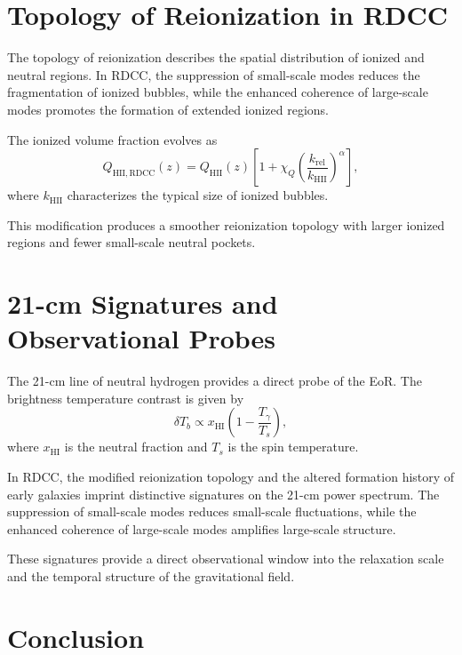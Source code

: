 \documentclass[11pt,a4paper]{article}
\begin{document}
\section{Topology of Reionization in RDCC}

The topology of reionization describes the spatial distribution of ionized and 
neutral regions. In RDCC, the suppression of small-scale modes reduces the 
fragmentation of ionized bubbles, while the enhanced coherence of large-scale modes 
promotes the formation of extended ionized regions.

The ionized volume fraction evolves as
\begin{equation}
    Q_{\mathrm{HII,RDCC}}(z)
    = Q_{\mathrm{HII}}(z)
      \left[
        1 + \chi_{Q}
        \left(\frac{k_{\mathrm{rel}}}{k_{\mathrm{HII}}}\right)^{\alpha}
      \right],
\end{equation}
where $k_{\mathrm{HII}}$ characterizes the typical size of ionized bubbles.

This modification produces a smoother reionization topology with larger ionized 
regions and fewer small-scale neutral pockets.
\section{21-cm Signatures and Observational Probes}

The 21-cm line of neutral hydrogen provides a direct probe of the EoR. The 
brightness temperature contrast is given by
\begin{equation}
    \delta T_{b}
    \propto x_{\mathrm{HI}}
    \left(1 - \frac{T_{\gamma}}{T_{s}}\right),
\end{equation}
where $x_{\mathrm{HI}}$ is the neutral fraction and $T_{s}$ is the spin temperature.

In RDCC, the modified reionization topology and the altered formation history of 
early galaxies imprint distinctive signatures on the 21-cm power spectrum. The 
suppression of small-scale modes reduces small-scale fluctuations, while the 
enhanced coherence of large-scale modes amplifies large-scale structure.

These signatures provide a direct observational window into the relaxation scale 
and the temporal structure of the gravitational field.
\section{Conclusion}
\end{document}
